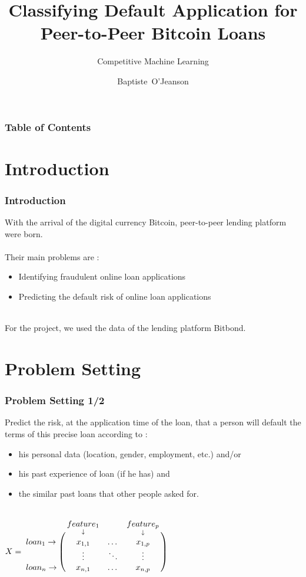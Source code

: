 \documentclass[10pt,handout,english]{beamer}
\title[Default Classification]{Classifying Default Application for \\Peer-to-Peer Bitcoin Loans\\}
\subtitle{Competitive Machine Learning}
\author[Baptiste O'Jeanson]{Baptiste~O'Jeanson}
\institute[Potsdam University]{Institute of Computer Science}
\date{}
\begin{document}
	\maketitle

	\begin{frame}
	\frametitle{Table of Contents}
	\tableofcontents[currentsection, sectionstyle=show, subsectionstyle=show, subsubsectionstyle=hide]
	\end{frame}

	\section{Introduction}
		\begin{frame}
		\frametitle{Introduction}
			With the arrival of the digital currency Bitcoin, peer-to-peer lending platform were born.\\~\\
			Their main problems are :
			\begin{itemize}
				\item Identifying fraudulent online loan applications
				\item Predicting the default risk of online loan applications\\~\\
			\end{itemize}
			For the project, we used the data of the lending platform Bitbond.
		\end{frame}


	\section{Problem Setting}
		\begin{frame}
		\frametitle{Problem Setting 1/2}
			Predict the risk, at the application time of the loan, that a person will default the terms of this precise loan according to :\\
			\begin{itemize}
				\item his personal data (location, gender, employment, etc.) and/or
				\item his past experience of loan (if he has) and
				\item the similar past loans that other people asked for.\\~\\
			\end{itemize}
			$X = \bordermatrix{~ & \underset{\downarrow}{feature_1} & & \underset{\downarrow}{feature_p} \cr
			loan_1 \rightarrow & x_{1,1} & \dots & x_{1,p} \cr
			~ & \vdots & \ddots & \vdots \cr
			loan_n \rightarrow & x_{n,1} & \dots & x_{n,p} \cr}$
		\end{frame}
\end{document}
